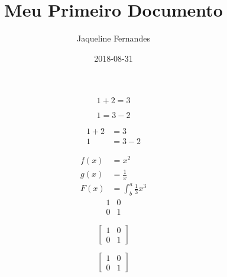 \documentclass{article}
\title{Meu Primeiro Documento}
\date{2018-08-31}
\author{Jaqueline Fernandes}
\begin{document}
	\begin{equation*}
		1 + 2 = 3
	\end{equation*}

	\begin{equation*}
		1 = 3 - 2
	\end{equation*}

	\begin{align*}
		1 + 2 &=3 \\
		1 &= 3 - 2
	\end{align*}

	\begin{align*}
		f(x) &= x^2 \\
		g(x) &= \frac{1}{x} \\
		F(x) &= \int^a_b \frac{1}{3}x^3
	\end{align*}
$$	
	\begin{matrix}
		1 & 0 \\
		0 & 1
	\end{matrix}
$$

$$
	[
	\begin{matrix}
		1 & 0 \\
		0 & 1
	\end{matrix}
	]
$$

$$	
	\left[
	\begin{matrix}
		1 & 0 \\
		0 & 1
	\end{matrix}
	\right]	
$$
\end{document}
